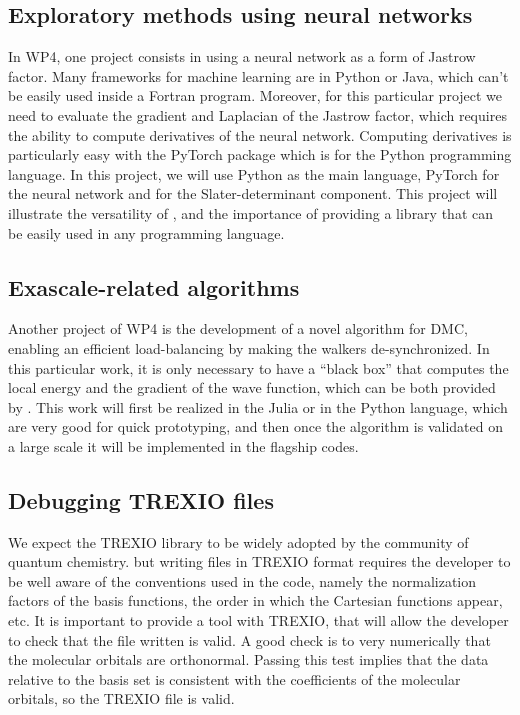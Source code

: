 \subsection{Exploratory methods using neural networks}

In \ac{WP}4, one project consists in using a neural network as a
form of Jastrow factor. Many frameworks for machine learning are in
Python or Java, which can't be easily used inside a Fortran program.
Moreover, for this particular project we need to evaluate the gradient
and Laplacian of the Jastrow factor, which requires the ability to
compute derivatives of the neural network. Computing derivatives is
particularly easy with the PyTorch package which is for the Python
programming language. In this project, we will use Python as the main
language, PyTorch for the neural network and \QMCkl for the
Slater-determinant component. This project will illustrate the
versatility of \QMCkl, and the importance of providing a library that
can be easily used in any programming language.


\subsection{Exascale-related algorithms}

Another project of \ac{WP}4 is the development of a novel algorithm
for \ac{DMC}, enabling an efficient load-balancing by
making the walkers de-synchronized. In this particular work, it is only
necessary to have a ``black box'' that computes the local energy and
the gradient of the wave function, which can be both provided by \QMCkl{}.
This work will first be realized in the Julia or in the Python
language, which are very good for quick prototyping, and then once the
algorithm is validated on a large scale it will be implemented in the
flagship codes.


\subsection{Debugging TREXIO files}

We expect the \ac{TREXIO} library to be widely adopted by the community of
quantum chemistry. but writing files in \ac{TREXIO} format requires the developer
to be well aware of the conventions used in the code, namely the normalization factors
of the basis functions, the order in which the Cartesian functions appear, etc.
It is important to provide a tool with \ac{TREXIO}, that will allow the developer to
check that the file written is valid. A good check is to very numerically that the
molecular orbitals are orthonormal. Passing this test implies that the data
relative to the basis set is consistent with the coefficients of the molecular
orbitals, so the \ac{TREXIO} file is valid.

